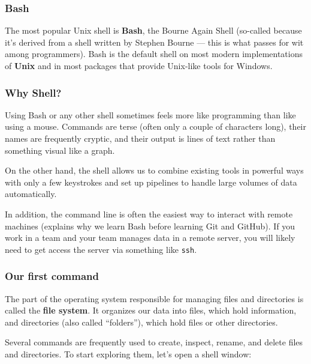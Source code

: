 \documentclass[
  letterpaper,
  DIV=11,
  numbers=noendperiod]{scrreprt}
\begin{document}
\hypertarget{bash}{%
\subsubsection*{Bash}\label{bash}}

The most popular Unix shell is \textbf{Bash}, the Bourne Again Shell
(so-called because it's derived from a shell written by Stephen Bourne
--- this is what passes for wit among programmers). Bash is the default
shell on most modern implementations of \textbf{Unix} and in most
packages that provide Unix-like tools for Windows.

\hypertarget{why-shell}{%
\subsubsection*{Why Shell?}\label{why-shell}}

Using Bash or any other shell sometimes feels more like programming than
like using a mouse. Commands are terse (often only a couple of
characters long), their names are frequently cryptic, and their output
is lines of text rather than something visual like a graph.

On the other hand, the shell allows us to combine existing tools in
powerful ways with only a few keystrokes and set up pipelines to handle
large volumes of data automatically.

In addition, the command line is often the easiest way to interact with
remote machines (explains why we learn Bash before learning Git and
GitHub). If you work in a team and your team manages data in a remote
server, you will likely need to get access the server via something like
\texttt{ssh}.

\hypertarget{our-first-command}{%
\subsubsection*{Our first command}\label{our-first-command}}

The part of the operating system responsible for managing files and
directories is called the \textbf{file system}. It organizes our data
into files, which hold information, and directories (also called
``folders''), which hold files or other directories.

Several commands are frequently used to create, inspect, rename, and
delete files and directories. To start exploring them, let's open a
shell window:
\end{document}
